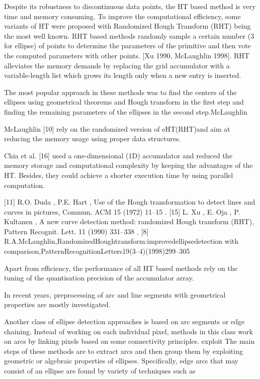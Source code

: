 \documentclass[a4paper]{report}
\begin{document}
Despite its robustness to discontinuous data points, the HT based method is very time and memory consuming. 
To improve the computational efficiency, some variants of HT were proposed with Randomized Hough Transform (RHT) being the most well known. RHT based methods randomly sample a certain number (3 for ellipse) of points to determine the parameters of the primitive and then vote the computed parameters with other points. 
[Xu 1990, McLaughlin 1998].
RHT alleviates the memory demands by replacing the grid accumulator with a variable-length list which grows its length only when a new entry is inserted.





The most popular approach in
these methods was to find the centers of the ellipses using
geometrical theorems and Hough transform in the first step and
finding the remaining parameters of the ellipses in the second step.McLaughlin

McLaughlin [10] rely on the randomized version of eHT(RHT)and aim at reducing the memory usage using proper data structures.

Chia et al. [16] used a one-dimensional (1D) accumulator and reduced the memory storage and computational complexity by keeping the advantages of the HT. Besides, they could achieve a shorter execution time by using parallel computation.


[11] R.O. Duda , P.E. Hart , Use of the Hough transformation to detect lines and curves in pictures, Commun. ACM 15 (1972) 11–15 .
[15] L. Xu , E. Oja , P. Kultanen , A new curve detection method: randomized Hough transform (RHT), Pattern Recognit. Lett. 11 (1990) 331–338 .
[8] R.A.McLaughlin,RandomizedHoughtransform:improvedellipsedetection
with comparison,PatternRecognitionLetters19(3–4)(1998)299–305


Apart from efficiency, the performance of all HT based methods rely on the tuning of the quantisation precision of the accumulator array.



In recent years, preprocessing of arc and line segments with geometrical properties are mostly investigated.

Another class of ellipse detection approaches is based on arc segments or edge chaining. 
Instead of working on each individual pixel, methods in this class work on arcs by linking pixels based on some connectivity principles.
exploit
The main steps of these methods are to extract arcs and then group them by exploiting geometric or algebraic properties of ellipses.
Specifically, edge arcs that may consist of an ellipse are found by variety of techniques such as
\end{document}
